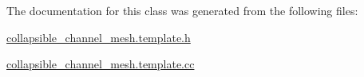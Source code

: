 The documentation for this class was generated from the following files\+:\begin{DoxyCompactItemize}
\item 
\hyperlink{collapsible__channel__mesh_8template_8h}{collapsible\+\_\+channel\+\_\+mesh.\+template.\+h}\item 
\hyperlink{collapsible__channel__mesh_8template_8cc}{collapsible\+\_\+channel\+\_\+mesh.\+template.\+cc}\end{DoxyCompactItemize}
